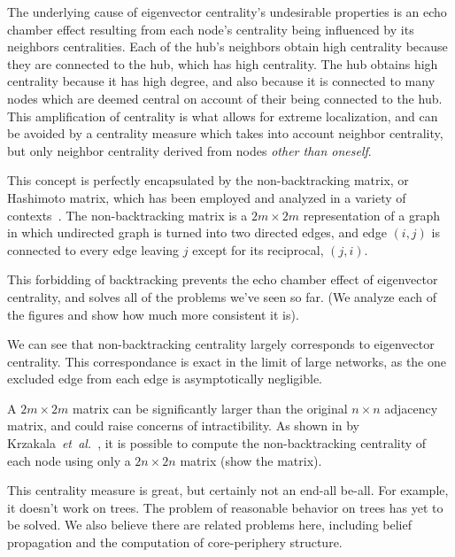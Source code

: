 \documentclass[twocolumn,prl,superscriptaddress]{revtex4}
\newcommand{\etal}{{\it{}et~al.}}
\begin{document}
The underlying cause of eigenvector centrality's undesirable properties is an echo chamber effect resulting from each node's centrality being influenced by its neighbors centralities. Each of the hub's neighbors obtain high centrality because they are connected to the hub, which has high centrality. The hub obtains high centrality because it has high degree, and also because it is connected to many nodes which are deemed central on account of their being connected to the hub. This amplification of centrality is what allows for extreme localization, and can be avoided by a centrality measure which takes into account neighbor centrality, but only neighbor centrality derived from nodes \emph{other than oneself}.

This concept is perfectly encapsulated by the non-backtracking matrix, or Hashimoto matrix, which has been employed and analyzed in a variety of contexts~\cite{hashimoto89,angel07,krzakala13}. The non-backtracking matrix is a $2m \times 2m$ representation of a graph in which undirected graph is turned into two directed edges, and edge $(i,j)$ is connected to every edge leaving $j$ except for its reciprocal, $(j,i)$.

This forbidding of backtracking prevents the echo chamber effect of eigenvector centrality, and solves all of the problems we've seen so far. (We analyze each of the figures and show how much more consistent it is).

We can see that non-backtracking centrality largely corresponds to eigenvector centrality. This correspondance is exact in the limit of large networks, as the one excluded edge from each edge is asymptotically negligible.

A $2m \times 2m$ matrix can be significantly larger than the original $n \times n$ adjacency matrix, and could raise concerns of intractibility. As shown in by Krzakala~\etal~\cite{krzakala13}, it is possible to compute the non-backtracking centrality of each node using only a $2n \times 2n$ matrix (show the matrix).



This centrality measure is great, but certainly not an end-all be-all. For example, it doesn't work on trees. The problem of reasonable behavior on trees has yet to be solved. We also believe there are related problems here, including belief propagation and the computation of core-periphery structure.
\end{document}
